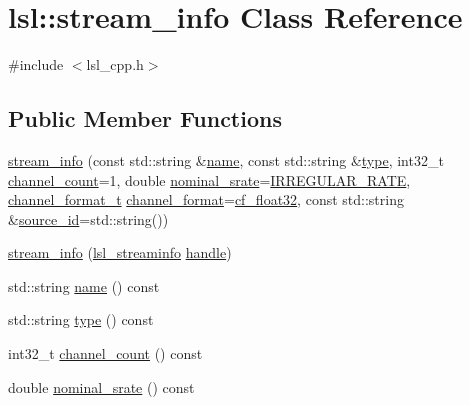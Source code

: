 \hypertarget{classlsl_1_1stream__info}{}\section{lsl\+:\+:stream\+\_\+info Class Reference}
\label{classlsl_1_1stream__info}


{\ttfamily \#include $<$lsl\+\_\+cpp.\+h$>$}

\subsection*{Public Member Functions}
\begin{DoxyCompactItemize}
\item 
\hyperlink{classlsl_1_1stream__info_a874f4899da89168b768cfe9acdd569a0}{stream\+\_\+info} (const std\+::string \&\hyperlink{classlsl_1_1stream__info_a0862e5c580d65ecf9ceb1fcc26f2ca34}{name}, const std\+::string \&\hyperlink{classlsl_1_1stream__info_a2162830f6867e9513eba9385eb0cbb99}{type}, int32\+\_\+t \hyperlink{classlsl_1_1stream__info_acf09957c1c61a9d9e0f9439037eec305}{channel\+\_\+count}=1, double \hyperlink{classlsl_1_1stream__info_a35b9b9b8947915f9f9518333342e2835}{nominal\+\_\+srate}=\hyperlink{namespacelsl_ac7ebddefe1091ef2d9459b6f9d79f7ab}{I\+R\+R\+E\+G\+U\+L\+A\+R\+\_\+\+R\+A\+TE}, \hyperlink{namespacelsl_a28d50dae6fd82eea8893ce3d63ccd46c}{channel\+\_\+format\+\_\+t} \hyperlink{classlsl_1_1stream__info_aa9695e52570e617d1c7dd4ea9f88b15d}{channel\+\_\+format}=\hyperlink{namespacelsl_a28d50dae6fd82eea8893ce3d63ccd46ca46efa3307b337f7de592753642584616}{cf\+\_\+float32}, const std\+::string \&\hyperlink{classlsl_1_1stream__info_a1f20c68246a88047978d9b03e14a9d2b}{source\+\_\+id}=std\+::string())
\item 
\hyperlink{classlsl_1_1stream__info_a7358ba03d8741b0b194cf9e747405702}{stream\+\_\+info} (\hyperlink{namespacelsl_aa0a9ce9956061679949daa2e35aae2e8}{lsl\+\_\+streaminfo} \hyperlink{classlsl_1_1stream__info_a532f6e8b29052cf11fbf87aeb3424304}{handle})
\item 
std\+::string \hyperlink{classlsl_1_1stream__info_a0862e5c580d65ecf9ceb1fcc26f2ca34}{name} () const
\item 
std\+::string \hyperlink{classlsl_1_1stream__info_a2162830f6867e9513eba9385eb0cbb99}{type} () const
\item 
int32\+\_\+t \hyperlink{classlsl_1_1stream__info_acf09957c1c61a9d9e0f9439037eec305}{channel\+\_\+count} () const
\item 
double \hyperlink{classlsl_1_1stream__info_a35b9b9b8947915f9f9518333342e2835}{nominal\+\_\+srate} () const

\end{DoxyCompactItemize}
